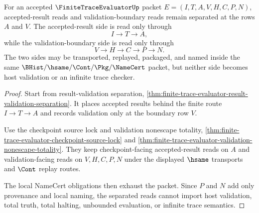 \begin{theorem}
\label{thm:finitetraceevaluator-root-trace-validation-separation}
For an accepted $\FiniteTraceEvaluatorUp$ packet $E=(I,T,A,V,H,C,P,N)$,
accepted-result reads and validation-boundary reads remain separated at the
rows $A$ and $V$. The accepted-result side is read only through
$$
I \to T \to A,
$$
while the validation-boundary side is read only through
$$
V \to H \to C \to P \to N.
$$
The two sides may be transported, replayed, packaged, and named inside the same
$\BHist/\hsame/\Cont/\Pkg/\NameCert$ packet, but neither side becomes host
validation or an infinite trace checker.
\end{theorem}
\begin{proof}
Start from result-validation separation,
\autoref{thm:finite-trace-evaluator-result-validation-separation}. It places
accepted results behind the finite route $I \to T \to A$ and records validation
only at the boundary row $V$.

Use the checkpoint source lock and validation nonescape totality,
\autoref{thm:finite-trace-evaluator-checkpoint-source-lock} and
\autoref{thm:finite-trace-evaluator-validation-nonescape-totality}. They keep
checkpoint-facing accepted-result reads on $A$ and validation-facing reads on
$V,H,C,P,N$ under the displayed $\hsame$ transports and $\Cont$ replay routes.

The local NameCert obligations then exhaust the packet. Since $P$ and $N$ add
only provenance and local naming, the separated reads cannot import host
validation, total truth, total halting, unbounded evaluation, or infinite trace
semantics.
\end{proof}

